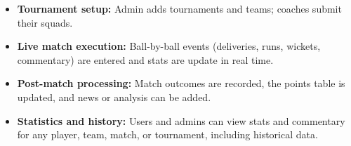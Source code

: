\begin{itemize}
\item
\protect{}\label{SMtbl6-1uANXvqV_RGvzP}
\textbf{Tournament setup:} Admin adds tournaments and teams; coaches submit their squads.
\item
\protect{}\label{cFVsO6eDJT2ZrB4iKTtav}
\textbf{Live match execution:} Ball-by-ball events (deliveries, runs, wickets, commentary) are entered and stats are update in real time.
\item
\protect{}\label{Tjp5Dy_BgbK87tlSfLnZZ}
\textbf{Post-match processing:} Match outcomes are recorded, the points table is updated, and news or analysis can be added.
\item
\protect{}\label{jAeBkocQFL1ahYYN7Gio_}
\textbf{Statistics and history:} Users and admins can view stats and commentary for any player, team, match, or tournament, including historical data.
\end{itemize}

